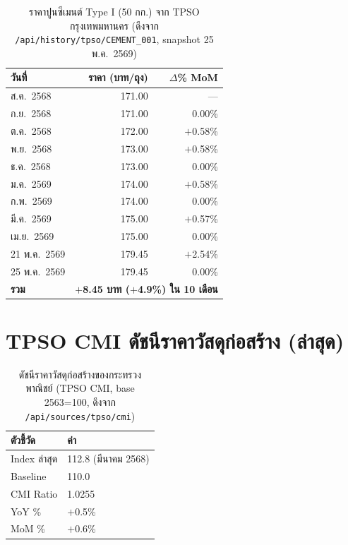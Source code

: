 \begin{table}[H]\centering
\caption{ราคาปูนซีเมนต์ Type I (50 กก.) จาก TPSO กรุงเทพมหานคร
(ดึงจาก \texttt{/api/history/tpso/CEMENT\_001}, snapshot 25 พ.ค.\ 2569)}
\label{tab:tpso-history}
\begin{tabularx}{\textwidth}{lrr}
\toprule
\textbf{วันที่} & \textbf{ราคา (บาท/ถุง)} & \textbf{$\Delta$\% MoM} \\
\midrule
ส.ค.\ 2568 & 171.00 & --- \\
ก.ย.\ 2568 & 171.00 & 0.00\% \\
ต.ค.\ 2568 & 172.00 & $+$0.58\% \\
พ.ย.\ 2568 & 173.00 & $+$0.58\% \\
ธ.ค.\ 2568 & 173.00 & 0.00\% \\
ม.ค.\ 2569 & 174.00 & $+$0.58\% \\
ก.พ.\ 2569 & 174.00 & 0.00\% \\
มี.ค.\ 2569 & 175.00 & $+$0.57\% \\
เม.ย.\ 2569 & 175.00 & 0.00\% \\
21 พ.ค.\ 2569 & 179.45 & $+$2.54\% \\
25 พ.ค.\ 2569 & 179.45 & 0.00\% \\
\midrule
\textbf{รวม} & \multicolumn{2}{r}{\textbf{$+$8.45 บาท ($+$4.9\%) ใน 10 เดือน}} \\
\bottomrule
\end{tabularx}
\end{table}

\section{TPSO CMI ดัชนีราคาวัสดุก่อสร้าง (ล่าสุด)}

\begin{table}[H]\centering
\caption{ดัชนีราคาวัสดุก่อสร้างของกระทรวงพาณิชย์ (TPSO CMI, base 2563=100,
ดึงจาก \texttt{/api/sources/tpso/cmi})}
\label{tab:cmi-latest}
\begin{tabularx}{\textwidth}{lX}
\toprule
\textbf{ตัวชี้วัด} & \textbf{ค่า} \\
\midrule
Index ล่าสุด & 112.8 (มีนาคม 2568) \\
Baseline & 110.0 \\
CMI Ratio & 1.0255 \\
YoY \% & $+$0.5\% \\
MoM \% & $+$0.6\% \\
\bottomrule
\end{tabularx}
\end{table}

